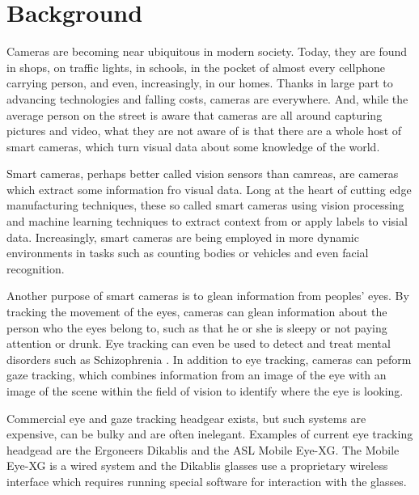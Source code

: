 \section{Background}
\label{sec:background}

Cameras are becoming near ubiquitous in modern society.  Today, they are found in shops, on traffic lights, in schools, in the pocket of almost every cellphone carrying person, and even, increasingly, in our homes.  Thanks in large part to advancing technologies and falling costs, cameras are everywhere.  And, while the average person on the street is aware that cameras are all around capturing pictures and video, what they are not aware of is that there are a whole host of smart cameras, which turn visual data about some knowledge of the world.

Smart cameras, perhaps better called vision sensors than camreas, are cameras which extract some information fro visual data.  Long at the heart of cutting edge manufacturing techniques, these so called smart cameras using vision processing and machine learning techniques to extract context from or apply labels to visial data.  Increasingly, smart cameras are being employed in more dynamic environments in tasks such as counting bodies or vehicles and even facial recognition.

Another purpose of smart cameras is to glean information from peoples' eyes.  By tracking the movement of the eyes, cameras can glean information about the person who the eyes belong to, such as that he or she is sleepy or not paying attention or drunk.  Eye tracking can even be used to detect and treat mental disorders such as Schizophrenia \cite{schizo-abnormalities}.  In addition to eye tracking, cameras can peform gaze tracking, which combines information from an image of the eye with an image of the scene within the field of vision to identify where the eye is looking.

Commercial eye and gaze tracking headgear exists, but such systems are expensive, can be bulky and are often inelegant.  Examples of current eye tracking headgead are the Ergoneers Dikablis and the ASL Mobile Eye-XG.  The Mobile Eye-XG is a wired system and the Dikablis glasses use a proprietary wireless interface which requires running special software for interaction with the glasses.





